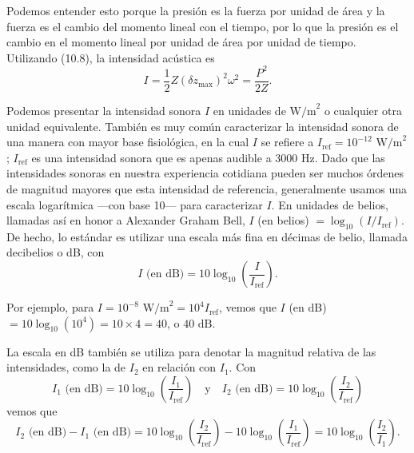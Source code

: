 \documentclass[12pt]{book}
\begin{document}
Podemos entender esto porque la presión es la fuerza por unidad de área y la fuerza es el cambio del momento lineal con el tiempo, por lo que la presión es el cambio en el momento lineal por unidad de área por unidad de tiempo. Utilizando (10.8), la intensidad acústica es
\begin{equation}
I = \frac{1}{2}Z(\delta z_{\text{max}})^2\omega^2 = \frac{P^2}{2Z}.
\label{eq:10.9}
\end{equation}

Podemos presentar la intensidad sonora $I$ en unidades de $\text{W/m}^2$ o cualquier otra unidad equivalente. También es muy común caracterizar la intensidad sonora de una manera con mayor base fisiológica, en la cual $I$ se refiere a $I_{\text{ref}} = 10^{-12}\text{ W/m}^2$; $I_{\text{ref}}$ es una intensidad sonora que es apenas audible a $3000\text{ Hz}$. Dado que las intensidades sonoras en nuestra experiencia cotidiana pueden ser muchos órdenes de magnitud mayores que esta intensidad de referencia, generalmente usamos una escala logarítmica ---con base 10--- para caracterizar $I$. En unidades de belios, llamadas así en honor a Alexander Graham Bell, $I$ (en belios) $= \log_{10}(I/I_{\text{ref}})$. De hecho, lo estándar es utilizar una escala más fina en décimas de belio, llamada decibelios o dB, con
\begin{equation}
I\text{ (en dB)} = 10\log_{10}\left(\frac{I}{I_{\text{ref}}}\right).
\label{eq:10.10}
\end{equation}

Por ejemplo, para $I = 10^{-8}\text{ W/m}^2 = 10^4 I_{\text{ref}}$, vemos que $I$ (en dB) $= 10\log_{10}(10^4) = 10 \times 4 = 40$, o $40\text{ dB}$.

La escala en dB también se utiliza para denotar la magnitud relativa de las intensidades, como la de $I_2$ en relación con $I_1$. Con
\begin{equation}
I_1\text{ (en dB)} = 10\log_{10}\left(\frac{I_1}{I_{\text{ref}}}\right)\quad\text{y}\quad I_2\text{ (en dB)} = 10\log_{10}\left(\frac{I_2}{I_{\text{ref}}}\right)
\label{eq:10.11}
\end{equation}
vemos que
\begin{equation}
I_2\text{ (en dB)} - I_1\text{ (en dB)} = 10\log_{10}\left(\frac{I_2}{I_{\text{ref}}}\right) - 10\log_{10}\left(\frac{I_1}{I_{\text{ref}}}\right) = 10\log_{10}\left(\frac{I_2}{I_1}\right).
\label{eq:10.12}
\end{equation}
\end{document}
